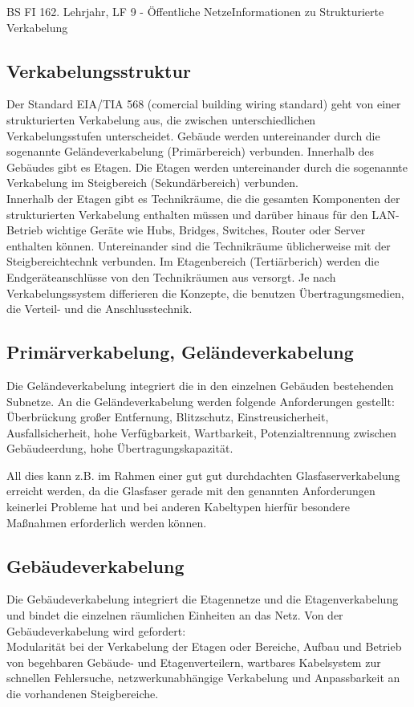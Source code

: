 \documentclass[11pt,twocolumn,oneside,openany,headings=optiontotoc,11pt,numbers=noenddot]{article}
\begin{document}
\begin{worksheet}{BS FI 16}{2. Lehrjahr, LF 9 - Öffentliche Netze}{Informationen zu \glqq{}Strukturierte Verkabelung\grqq{}}
		\subsection*{Verkabelungsstruktur} Der Standard EIA/TIA 568 (comercial building wiring standard) geht von einer strukturierten Verkabelung aus, die zwischen unterschiedlichen Verkabelungsstufen unterscheidet. Gebäude werden untereinander durch die sogenannte Geländeverkabelung (Primärbereich) verbunden. Innerhalb des Gebäudes gibt es Etagen. Die Etagen werden untereinander durch die sogenannte Verkabelung im Steigbereich (Sekundärbereich) verbunden.\\
		Innerhalb der Etagen gibt es Technikräume, die die gesamten Komponenten der strukturierten Verkabelung enthalten müssen und darüber hinaus für den LAN-Betrieb wichtige Geräte wie Hubs, Bridges, Switches, Router oder Server enthalten können. Untereinander sind die Technikräume üblicherweise mit der Steigbereichtechnk verbunden. Im Etagenbereich (Tertiärberich) werden die Endgeräteanschlüsse von den Technikräumen aus versorgt. Je nach Verkabelungssystem differieren die Konzepte, die benutzen Übertragungsmedien, die Verteil- und die Anschlusstechnik.\\
		\subsection*{Primärverkabelung, Geländeverkabelung} Die Geländeverkabelung integriert die in den einzelnen Gebäuden bestehenden Subnetze. An die Geländeverkabelung werden folgende Anforderungen gestellt:\\
		Überbrückung großer Entfernung, Blitzschutz, Einstreusicherheit, Ausfallsicherheit, hohe Verfügbarkeit, Wartbarkeit, Potenzialtrennung zwischen Gebäudeerdung, hohe Übertragungskapazität.\\
		\par\noindent
		All dies kann z.B. im Rahmen einer gut gut durchdachten Glasfaserverkabelung erreicht werden, da die Glasfaser gerade mit den genannten Anforderungen keinerlei Probleme hat und bei anderen Kabeltypen hierfür besondere Maßnahmen erforderlich werden können.
		\subsection*{Gebäudeverkabelung} Die Gebäudeverkabelung integriert die Etagennetze und die Etagenverkabelung und bindet die einzelnen räumlichen Einheiten an das Netz. Von der Gebäudeverkabelung wird gefordert:\\
		Modularität bei der Verkabelung der Etagen oder Bereiche, Aufbau und Betrieb von begehbaren Gebäude- und Etagenverteilern, wartbares Kabelsystem zur schnellen Fehlersuche, netzwerkunabhängige Verkabelung und Anpassbarkeit an die vorhandenen Steigbereiche.

\end{worksheet}
\end{document}
